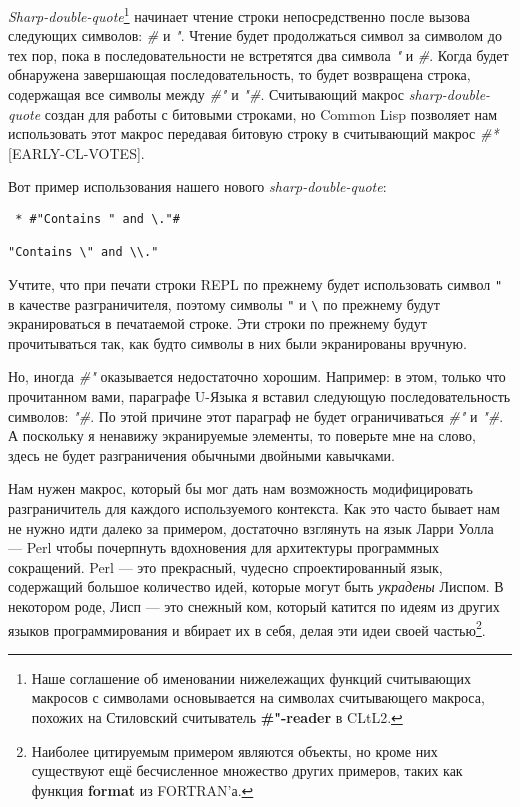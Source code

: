 \emph{Sharp-double-quote}\footnote{Наше соглашение об именовании нижележащих функций считывающих макросов с символами основывается на символах считывающего макроса, похожих на Стиловский считыватель \textbf{\#"-reader} в CLtL2.} начинает чтение строки непосредственно после вызова следующих символов: \emph{\#} и \emph{"}. Чтение будет продолжаться символ за символом до тех пор, пока в последовательности не встретятся два символа \emph{"} и \emph{\#}. Когда будет обнаружена завершающая последовательность, то будет возвращена строка, содержащая все символы между \emph{\#"} и \emph{"\#}. Считывающий макрос \emph{sharp-double-quote} создан для работы с битовыми строками, но Common Lisp позволяет нам использовать этот макрос передавая битовую строку в считывающий макрос \emph{\#*} [EARLY-CL-VOTES]. 

Вот пример использования нашего нового \emph{sharp-double-quote}:

\begin{verbatim}
 * #"Contains " and \."#

"Contains \" and \\."
\end{verbatim}

Учтите, что при печати строки REPL по прежнему будет использовать символ \verb|"| в качестве разграничителя, поэтому символы \verb|"| и \verb"\" по прежнему будут экранироваться в печатаемой строке. Эти строки по прежнему будут прочитываться так, как будто символы в них были экранированы вручную.

Но, иногда \emph{\#"} оказывается недостаточно хорошим. Например: в этом, только что прочитанном вами, параграфе U-Языка я вставил следующую последовательность символов: \emph{"\#}. По этой причине этот параграф не будет ограничиваться \emph{\#"} и \emph{"\#}. А поскольку я ненавижу экранируемые элементы, то поверьте мне на слово, здесь не будет разграничения обычными двойными кавычками.

Нам нужен макрос, который бы мог дать нам возможность модифицировать разграничитель для каждого используемого контекста. Как это часто бывает нам не нужно идти далеко за примером, достаточно взглянуть на язык Ларри Уолла --- Perl чтобы почерпнуть вдохновения для архитектуры программных сокращений. Perl --- это прекрасный, чудесно спроектированный язык, содержащий большое количество идей, которые могут быть \emph{украдены} Лиспом. В некотором роде, Лисп --- это снежный ком, который катится по идеям из других языков программирования и вбирает их в себя, делая эти идеи своей частью\footnote{Наиболее цитируемым примером являются объекты, но кроме них существуют ещё бесчисленное множество других примеров, таких как функция \textbf{format} из FORTRAN'а.}.

